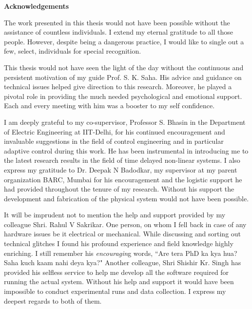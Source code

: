 \doublespacing
\newpage
\thispagestyle{empty}
\mbox{}

\newpage

\begin{center}
\textbf{\Large{Acknowledgements}}
\bigskip
\bigskip
\end{center}

The work presented in this thesis would not have been possible without the assistance
of countless individuals.  I extend my eternal gratitude  to all those people. However, despite being a dangerous practice, I would like to single out a few, select, individuals for special recognition.

 This thesis would not have seen the light of the day without the continuous and persistent motivation of my guide Prof. S. K. Saha. His advice and guidance  on technical  issues helped give direction to this research. Moreover, he played a pivotal role in providing the much needed psychological and emotional support. Each and every meeting with him was a booster to my self confidence. 
 
    
I am deeply grateful to my co-supervisor, Professor S. Bhasin in the Department of Electric Engineering at  IIT-Delhi, for his continued encouragement and invaluable suggestions in the field of control engineering and in particular adaptive control during this work. He has been instrumental in introducing me to the latest research results  in the field of time delayed non-linear systems.  
I also express my gratitude to Dr. Deepak N Badodkar, my supervisor at my parent organization BARC, Mumbai for his encouragement and the logistic support he had provided throughout the tenure of my research. Without his support the development and fabrication  of the  physical system would not have been possible.  


It will be imprudent not to mention the help and support provided by my colleague Shri. Rahul V Sakrikar. One person, on whom I fell back in case of any hardware issues be it electrical or mechanical. While discussing and sorting out technical glitches I found his profound experience and field knowledge highly enriching. I still remember his \textit{encouragin}g words, ``Are tera PhD ka kya hua? Saha kuch kaam nahi deya kya?" Another colleague, Shri Shishir Kr. Singh has provided his selfless service to help me develop all the software required for running the actual system. Without his help and support it would have been impossible to conduct experimental runs and data collection. I express my deepest regards to both of them.

